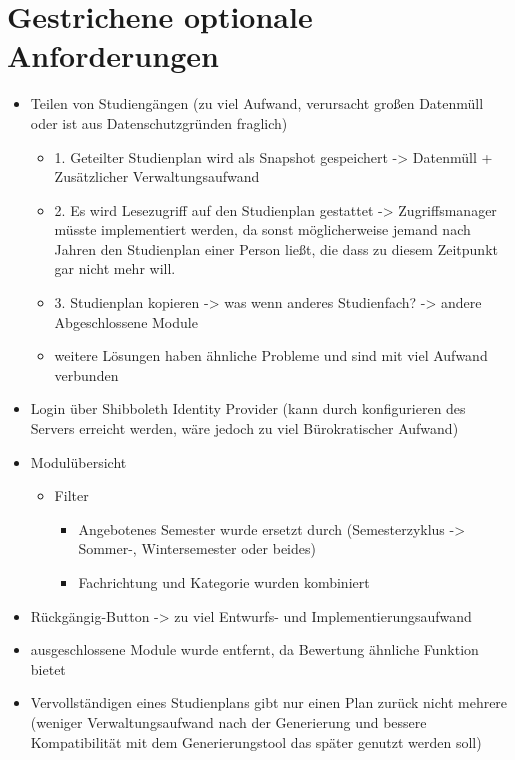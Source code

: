 \section{Gestrichene optionale Anforderungen}
\begin{itemize}
	\item Teilen von Studiengängen (zu viel Aufwand, verursacht großen Datenmüll oder ist aus Datenschutzgründen fraglich)
		\begin{itemize}
			\item 1. Geteilter Studienplan wird als Snapshot gespeichert -> Datenmüll + Zusätzlicher Verwaltungsaufwand
			\item 2. Es wird Lesezugriff auf den Studienplan gestattet -> Zugriffsmanager müsste implementiert werden, da sonst möglicherweise jemand nach Jahren den Studienplan einer Person ließt, die dass zu diesem Zeitpunkt gar nicht mehr will.
			\item 3. Studienplan kopieren -> was wenn anderes Studienfach? -> andere Abgeschlossene Module
			\item weitere Lösungen haben ähnliche Probleme und sind mit viel Aufwand verbunden
		\end{itemize}	
	\item Login über Shibboleth Identity Provider (kann durch konfigurieren des Servers erreicht werden, wäre jedoch zu viel Bürokratischer Aufwand)
	\item Modulübersicht
		\begin{itemize}
			\item Filter
				\begin{itemize}
					\item Angebotenes Semester wurde ersetzt durch (Semesterzyklus -> Sommer-, Wintersemester oder beides)
					\item Fachrichtung und Kategorie wurden kombiniert
				\end{itemize}
		\end{itemize}
	\item Rückgängig-Button -> zu viel Entwurfs- und Implementierungsaufwand
	\item ausgeschlossene Module wurde entfernt, da Bewertung ähnliche Funktion bietet
	\item Vervollständigen eines Studienplans gibt nur einen Plan zurück nicht mehrere (weniger Verwaltungsaufwand nach der Generierung und bessere Kompatibilität mit dem Generierungstool das später genutzt werden soll)
\end{itemize}